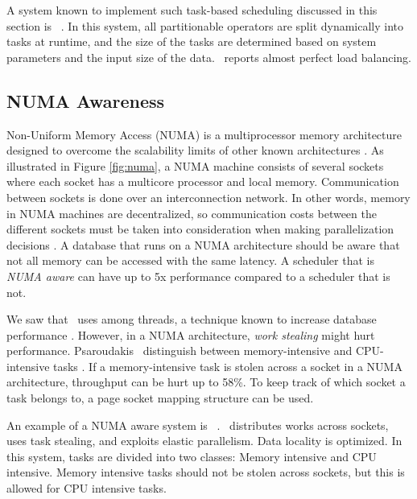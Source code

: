 A system known to implement such task-based scheduling discussed in this section is \hyrise~\cite{Schwalb2014-hn}. In this system, all partitionable operators are split dynamically into tasks at runtime, and the size of the tasks are determined based on system parameters and the input size of the data. \hyrise~reports almost perfect load balancing. 

\subsection{NUMA Awareness}
\label{sub:NUMA Awareness}
Non-Uniform Memory Access (NUMA) is a multiprocessor memory architecture designed to overcome the scalability limits of other known architectures \cite{Qlik2013-an}. As illustrated in Figure \ref{fig:numa}, a NUMA machine consists of several sockets where each socket has a multicore processor and local memory. Communication between sockets is done over an interconnection network. In other words, memory in NUMA machines are decentralized, so communication costs between the different sockets must be taken into consideration when making parallelization decisions \cite{Psaroudakis2015-lc}. A database that runs on a NUMA architecture should be aware that not all memory can be accessed with the same latency. A scheduler that is \textit{NUMA aware} can have up to 5x performance compared to a scheduler that is not.

We saw that \blink~uses  among threads, a technique known to increase database performance \cite{Barber2012-xt}. However, in a NUMA architecture, \textit{work stealing} might hurt performance. Psaroudakis \ea~distinguish between memory-intensive and CPU-intensive tasks \cite{Psaroudakis2015-lc}. If a memory-intensive task is stolen across a socket in a NUMA architecture, throughput can be hurt up to 58\%. To keep track of which socket a task belongs to, a page socket mapping structure can be used.

An example of a NUMA aware system is \hyper~\cite{Psaroudakis2014-ma, Psaroudakis2015-lc}. \hyper~distributes works across sockets,  uses task stealing, and exploits elastic parallelism. Data locality is optimized. In this system, tasks are divided into two classes: Memory intensive and CPU intensive. Memory intensive tasks should not be stolen across sockets, but this is allowed for CPU intensive tasks.

